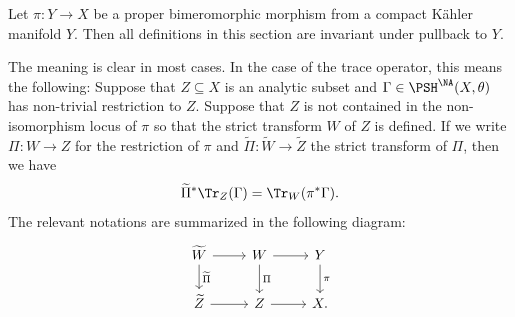 \begin{proposition}\label{prop:NApotential:L655}
    Let $\pi\colon Y\rightarrow X$ be a proper bimeromorphic morphism from a compact K\"ahler manifold $Y$. Then all definitions in this section are invariant under pullback to $Y$.
\end{proposition}
The meaning is clear in most cases. In the case of the trace operator, this means the following: Suppose that $Z\subseteq X$ is an analytic subset and $\Gamma\in \PSH^{\NA}(X,\theta)$ has non-trivial restriction to $Z$. Suppose that $Z$ is not contained in the non-isomorphism locus of $\pi$ so that the strict transform $W$ of $Z$ is defined. If we write $\Pi\colon W\rightarrow Z$ for the restriction of $\pi$ and $\widetilde{\Pi}\colon \widetilde{W}\rightarrow \widetilde{Z}$ the strict transform of $\Pi$, then we have
\[
    \widetilde{\Pi}^* \Tr_Z(\Gamma)=\Tr_W(\pi^*\Gamma).
\]
The relevant notations are summarized in the following diagram:
\[
\begin{tikzcd}
\widetilde{W} \arrow[r] \arrow[d, "\widetilde{\Pi}"] & W \arrow[r] \arrow[d, "\Pi"] & Y \arrow[d, "\pi"] \\
\widetilde{Z} \arrow[r]                          & Z \arrow[r]                  & X.
\end{tikzcd}
\]

